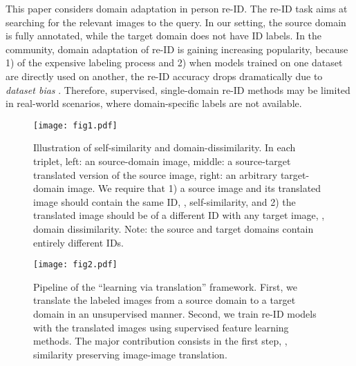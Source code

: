\documentclass[10pt,twocolumn,letterpaper]{article}
\begin{document}
This paper considers domain adaptation in person re-ID. The re-ID task aims at searching for the relevant images to the query. In our setting, the source domain is fully annotated, while the target domain does not have ID labels. In the community, domain adaptation of re-ID is gaining increasing popularity, because 1) of the expensive labeling process and 2) 
when models trained on one dataset are directly used on another, the re-ID accuracy drops dramatically \cite{fan17unsupervised} due to \emph{dataset bias} \cite{DBLP:conf/cvpr/TorralbaE11}.
Therefore, supervised, single-domain re-ID methods may be limited in real-world scenarios, where domain-specific labels are not available. 

\begin{figure}[]
\setlength{\abovecaptionskip}{-0.1cm} 
\setlength{\belowcaptionskip}{-0.2cm}
\begin{center}
\texttt{[image: fig1.pdf]}
\end{center}
\caption{Illustration of self-similarity and domain-dissimilarity. In each triplet, left: an source-domain image, middle: a source-target translated version of the source image, right: an arbitrary target-domain image. We require that 1) a source image and its translated image should contain the same ID, \ie, self-similarity, and 2) the translated image should be of a different ID with any target image, \ie, domain dissimilarity. Note: the source and target domains contain entirely different IDs. }
\label{fig:carton}
\end{figure}

\begin{figure*}[t]
\setlength{\abovecaptionskip}{-0.2cm}
\setlength{\belowcaptionskip}{-0.3cm}
\begin{center}
\texttt{[image: fig2.pdf]}
\end{center}
\caption{Pipeline of the ``learning via translation'' framework. First, we translate the labeled images from a source domain to a target domain in an unsupervised manner. Second, we train re-ID models with the translated images using supervised feature learning methods. The major contribution consists in the first step, \ie,  similarity preserving image-image translation.}
\label{fig:framework}
\end{figure*}
\end{document}
